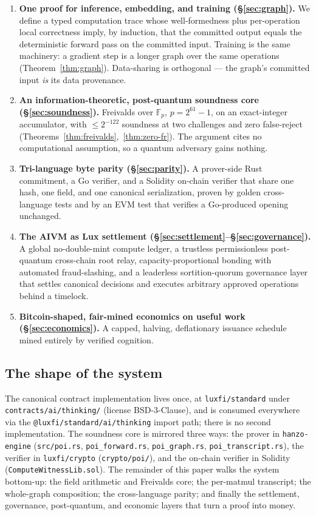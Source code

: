\documentclass[11pt,a4paper]{article}
\begin{document}
\begin{enumerate}
  \item \textbf{One proof for inference, embedding, and training (\S\ref{sec:graph}).} We define a typed computation trace whose well-formedness plus per-operation local correctness imply, by induction, that the committed output equals the deterministic forward pass on the committed input. Training is the same machinery: a gradient step is a longer graph over the same operations (Theorem~\ref{thm:graph}). Data-sharing is orthogonal --- the graph's committed input \emph{is} its data provenance.
  \item \textbf{An information-theoretic, post-quantum soundness core (\S\ref{sec:soundness}).} Freivalds over $\mathbb{F}_p$, $p = 2^{61}-1$, on an exact-integer accumulator, with $\le 2^{-122}$ soundness at two challenges and zero false-reject (Theorems~\ref{thm:freivalds},~\ref{thm:zero-fr}). The argument cites no computational assumption, so a quantum adversary gains nothing.
  \item \textbf{Tri-language byte parity (\S\ref{sec:parity}).} A prover-side Rust commitment, a Go verifier, and a Solidity on-chain verifier that share one hash, one field, and one canonical serialization, proven by golden cross-language tests and by an EVM test that verifies a Go-produced opening unchanged.
  \item \textbf{The AIVM as Lux settlement (\S\ref{sec:settlement}--\S\ref{sec:governance}).} A global no-double-mint compute ledger, a trustless permissionless post-quantum cross-chain root relay, capacity-proportional bonding with automated fraud-slashing, and a leaderless sortition-quorum governance layer that settles canonical decisions and executes arbitrary approved operations behind a timelock.
  \item \textbf{Bitcoin-shaped, fair-mined economics on useful work (\S\ref{sec:economics}).} A capped, halving, deflationary issuance schedule mined entirely by verified cognition.
\end{enumerate}

\subsection{The shape of the system}

The canonical contract implementation lives once, at \texttt{luxfi/standard} under \texttt{contracts/ai/thinking/} (license BSD-3-Clause), and is consumed everywhere via the \texttt{@luxfi/standard/ai/thinking} import path; there is no second implementation. The soundness core is mirrored three ways: the prover in \texttt{hanzo-engine} (\texttt{src/poi.rs}, \texttt{poi\_forward.rs}, \texttt{poi\_graph.rs}, \texttt{poi\_transcript.rs}), the verifier in \texttt{luxfi/crypto} (\texttt{crypto/poi/}), and the on-chain verifier in Solidity (\texttt{ComputeWitnessLib.sol}). The remainder of this paper walks the system bottom-up: the field arithmetic and Freivalds core; the per-matmul transcript; the whole-graph composition; the cross-language parity; and finally the settlement, governance, post-quantum, and economic layers that turn a proof into money.
\end{document}
